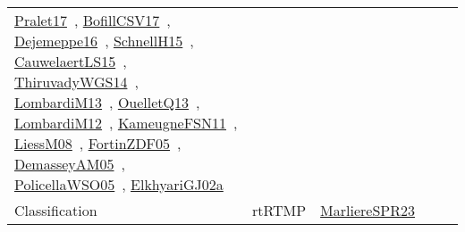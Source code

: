 {\begin{longtable}{lp{3cm}>{\raggedright\arraybackslash}p{6cm}>{\raggedright\arraybackslash}p{6cm}>{\raggedright\arraybackslash}p{8cm}}
\href{../works/Pralet17.pdf}{Pralet17}~\cite{Pralet17}, \href{../works/BofillCSV17.pdf}{BofillCSV17}~\cite{BofillCSV17}, \href{../works/Dejemeppe16.pdf}{Dejemeppe16}~\cite{Dejemeppe16}, \href{../works/SchnellH15.pdf}{SchnellH15}~\cite{SchnellH15}, \href{../works/CauwelaertLS15.pdf}{CauwelaertLS15}~\cite{CauwelaertLS15}, \href{../works/ThiruvadyWGS14.pdf}{ThiruvadyWGS14}~\cite{ThiruvadyWGS14}, \href{../works/LombardiM13.pdf}{LombardiM13}~\cite{LombardiM13}, \href{../works/OuelletQ13.pdf}{OuelletQ13}~\cite{OuelletQ13}, \href{../works/LombardiM12.pdf}{LombardiM12}~\cite{LombardiM12}, \href{../works/KameugneFSN11.pdf}{KameugneFSN11}~\cite{KameugneFSN11}, \href{../works/LiessM08.pdf}{LiessM08}~\cite{LiessM08}, \href{../works/FortinZDF05.pdf}{FortinZDF05}~\cite{FortinZDF05}, \href{../works/DemasseyAM05.pdf}{DemasseyAM05}~\cite{DemasseyAM05}, \href{../works/PolicellaWSO05.pdf}{PolicellaWSO05}~\cite{PolicellaWSO05}, \href{../works/ElkhyariGJ02a.pdf}{ElkhyariGJ02a}~\cite{ElkhyariGJ02a}\\
Classification & rtRTMP & \href{../works/MarliereSPR23.pdf}{MarliereSPR23}~\cite{MarliereSPR23} &  & \\

\end{longtable}}
